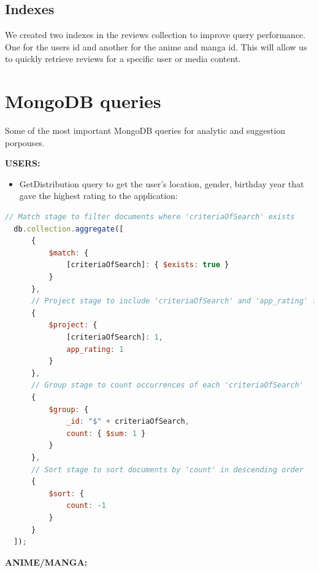 \subsection{Indexes}

We created two indexes in the reviews collection to improve query performance. One for the users id and another for the anime and manga id. This will allow us to quickly retrieve reviews for a specific user or media content. 

\section {MongoDB queries}
Some of the most important MongoDB queries for analytic and suggestion porpouses. 


\textbf{USERS:}
\begin{itemize}
  \item GetDistribution query to get the user's location, gender, birthday year that gave the highest rating to the application:
  
\end{itemize}
\begin{lstlisting}[language=JavaScript, caption=get distribution]
  // Match stage to filter documents where 'criteriaOfSearch' exists
  db.collection.aggregate([
      {
          $match: {
              [criteriaOfSearch]: { $exists: true }
          }
      },
      // Project stage to include 'criteriaOfSearch' and 'app_rating' fields
      {
          $project: {
              [criteriaOfSearch]: 1,
              app_rating: 1
          }
      },
      // Group stage to count occurrences of each 'criteriaOfSearch'
      {
          $group: {
              _id: "$" + criteriaOfSearch,
              count: { $sum: 1 }
          }
      },
      // Sort stage to sort documents by 'count' in descending order
      {
          $sort: {
              count: -1
          }
      }
  ]);
  \end{lstlisting}
  


\textbf{ANIME/MANGA:}

